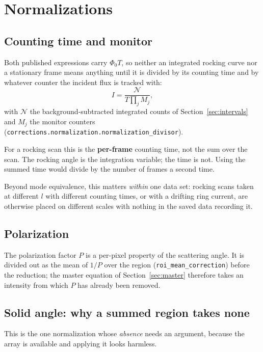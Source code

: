 \documentclass[11pt,a4paper]{article}
\newcommand{\code}[1]{\texttt{\small #1}}
\begin{document}
\section{Normalizations}
\label{sec:normalizations}

\subsection{Counting time and monitor}

Both published expressions carry $\Phi_0 T$, so neither an integrated rocking
curve nor a stationary frame means anything until it is divided by its
counting time and by whatever counter the incident flux is tracked with:
\begin{equation}
  I = \frac{\mathcal{N}}{T \prod_j M_j} ,
\end{equation}
with $\mathcal{N}$ the background-subtracted integrated counts of
Section~\ref{sec:intervals} and $M_j$ the monitor counters
(\code{corrections.normalization.normalization\_divisor}).

For a rocking scan this is the \textbf{per-frame} counting time, not the sum
over the scan. The rocking angle is the integration variable; the time is not.
Using the summed time would divide by the number of frames a second time.

Beyond mode equivalence, this matters \emph{within} one data set: rocking
scans taken at different $l$ with different counting times, or with a drifting
ring current, are otherwise placed on different scales with nothing in the
saved data recording it.

\subsection{Polarization}

The polarization factor $P$ is a per-pixel property of the scattering angle.
It is divided out as the mean of $1/P$ over the region
(\code{roi\_mean\_correction}) before the reduction; the master equation of
Section~\ref{sec:master} therefore takes an intensity from which $P$ has
already been removed.

\subsection{Solid angle: why a summed region takes none}
\label{sec:solidangle}

This is the one normalization whose \emph{absence} needs an argument, because
the array is available and applying it looks harmless.
\end{document}
